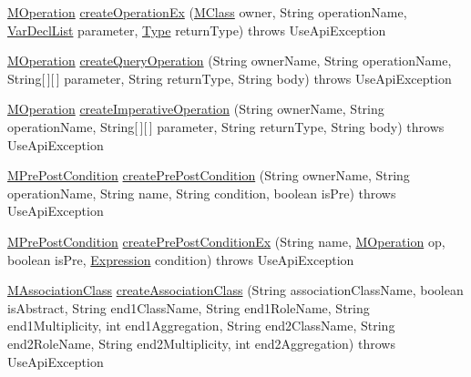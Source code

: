 \begin{DoxyCompactItemize}
\item 
\hyperlink{classorg_1_1tzi_1_1use_1_1uml_1_1mm_1_1_m_operation}{M\-Operation} \hyperlink{classorg_1_1tzi_1_1use_1_1api_1_1_use_model_api_adc7bac05b52b03114d4bedf15ff0d4c8}{create\-Operation\-Ex} (\hyperlink{interfaceorg_1_1tzi_1_1use_1_1uml_1_1mm_1_1_m_class}{M\-Class} owner, String operation\-Name, \hyperlink{classorg_1_1tzi_1_1use_1_1uml_1_1ocl_1_1expr_1_1_var_decl_list}{Var\-Decl\-List} parameter, \hyperlink{interfaceorg_1_1tzi_1_1use_1_1uml_1_1ocl_1_1type_1_1_type}{Type} return\-Type)  throws Use\-Api\-Exception 
\item 
\hyperlink{classorg_1_1tzi_1_1use_1_1uml_1_1mm_1_1_m_operation}{M\-Operation} \hyperlink{classorg_1_1tzi_1_1use_1_1api_1_1_use_model_api_a33e1702b75ba1d4310b9a3a19a6d0d32}{create\-Query\-Operation} (String owner\-Name, String operation\-Name, String\mbox{[}$\,$\mbox{]}\mbox{[}$\,$\mbox{]} parameter, String return\-Type, String body)  throws Use\-Api\-Exception 
\item 
\hyperlink{classorg_1_1tzi_1_1use_1_1uml_1_1mm_1_1_m_operation}{M\-Operation} \hyperlink{classorg_1_1tzi_1_1use_1_1api_1_1_use_model_api_a2be70fa8d878ded03f6ed1d6ca5200cd}{create\-Imperative\-Operation} (String owner\-Name, String operation\-Name, String\mbox{[}$\,$\mbox{]}\mbox{[}$\,$\mbox{]} parameter, String return\-Type, String body)  throws Use\-Api\-Exception 
\item 
\hyperlink{classorg_1_1tzi_1_1use_1_1uml_1_1mm_1_1_m_pre_post_condition}{M\-Pre\-Post\-Condition} \hyperlink{classorg_1_1tzi_1_1use_1_1api_1_1_use_model_api_ac540331210d898b7d11b16c83641a311}{create\-Pre\-Post\-Condition} (String owner\-Name, String operation\-Name, String name, String condition, boolean is\-Pre)  throws Use\-Api\-Exception 
\item 
\hyperlink{classorg_1_1tzi_1_1use_1_1uml_1_1mm_1_1_m_pre_post_condition}{M\-Pre\-Post\-Condition} \hyperlink{classorg_1_1tzi_1_1use_1_1api_1_1_use_model_api_a6889872f13d71df606a980cf4bf76c5f}{create\-Pre\-Post\-Condition\-Ex} (String name, \hyperlink{classorg_1_1tzi_1_1use_1_1uml_1_1mm_1_1_m_operation}{M\-Operation} op, boolean is\-Pre, \hyperlink{classorg_1_1tzi_1_1use_1_1uml_1_1ocl_1_1expr_1_1_expression}{Expression} condition)  throws Use\-Api\-Exception 
\item 
\hyperlink{interfaceorg_1_1tzi_1_1use_1_1uml_1_1mm_1_1_m_association_class}{M\-Association\-Class} \hyperlink{classorg_1_1tzi_1_1use_1_1api_1_1_use_model_api_af9bedac027023f2ba068069db59abb65}{create\-Association\-Class} (String association\-Class\-Name, boolean is\-Abstract, String end1\-Class\-Name, String end1\-Role\-Name, String end1\-Multiplicity, int end1\-Aggregation, String end2\-Class\-Name, String end2\-Role\-Name, String end2\-Multiplicity, int end2\-Aggregation)  throws Use\-Api\-Exception 

\end{DoxyCompactItemize}
